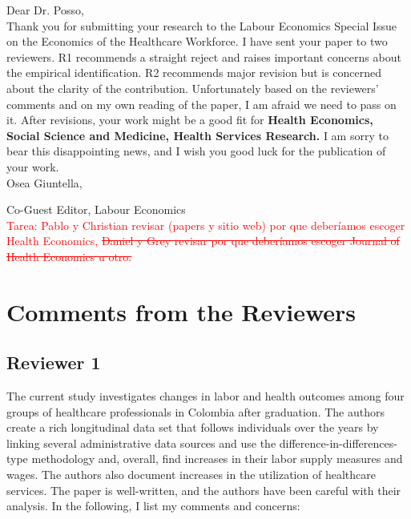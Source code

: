 \documentclass[12pt]{article}
\begin{document}
Dear Dr. Posso, \\

Thank you for submitting your research to the Labour Economics Special Issue on the Economics of the Healthcare Workforce. I have sent your paper to two reviewers. R1 recommends a straight reject and raises important concerns about the empirical identification. R2 recommends major revision but is concerned about the clarity of the contribution. Unfortunately based on the reviewers' comments and on my own reading of the paper, I am afraid we need to pass on it. After revisions, your work might be a good fit for \textbf{Health Economics, Social Science and Medicine, Health Services Research.} I am sorry to bear this disappointing news, and I wish you good luck for the publication of your work. \\

Osea Giuntella, 

Co-Guest Editor, Labour Economics \\

\textcolor{red}{Tarea: Pablo y Christian revisar (papers y sitio web) por que deberíamos escoger Health Economics, \st{Daniel y Grey revisar por que deberíamos escoger Journal of Health Economics u otro.}}

\section{Comments from the Reviewers}

\subsection{Reviewer 1}

The current study investigates changes in labor and health outcomes among four groups of healthcare professionals in Colombia after graduation. The authors create a rich longitudinal data set that follows individuals over the years by linking several administrative data sources and use the difference-in-differences-type methodology and, overall, find increases in their labor supply measures and wages. The authors also document increases in the utilization of healthcare services. The paper is well-written, and the authors have been careful with their analysis. In the following, I list my comments and concerns:
\end{document}
